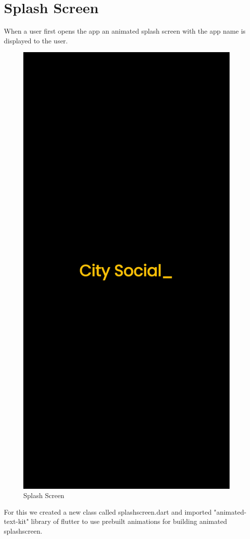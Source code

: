 \section{Splash Screen}
When a user first opens the app an animated splash screen with the app name is displayed to the user.
\begin{figure}[H]
    \centering
    \includegraphics[scale=0.10]{App Screenshots/SplashScreen.png}
    \caption{Splash Screen}
    \label{fig:Splash Screen}
\end{figure}
For this we created a new class called splashscreen.dart and imported "animated-text-kit" library of flutter to use prebuilt animations for building animated splashscreen.

